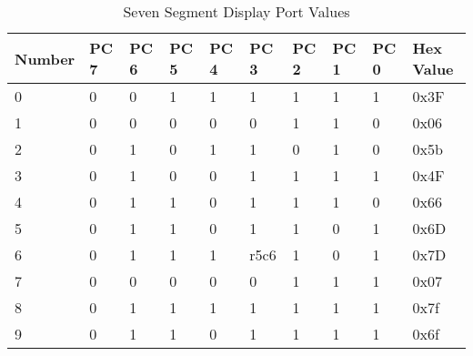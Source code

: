 \documentclass{article}
\begin{document}
\begin{table}[htb!]
	\caption{Seven Segment Display Port Values}
	\label{table:label}
	\centering
	\begin{tabular}{llllllllll}
		\toprule
		\textbf{Number} & \textbf{PC 7} & \textbf{PC 6} & \textbf{PC 5} & \textbf{PC 4} & \textbf{PC 3} & \textbf{PC 2} & \textbf{PC 1} & \textbf{PC 0} & \textbf{Hex Value}\\
		\midrule
		             0 &              0 &              0 &              1 &              1 &              1 &              1 &              1 &              1 &              0x3F\\
		             1 &              0 &              0 &              0 &              0 &              0 &              1 &              1 &              0 &              0x06\\
		             2 &              0 &              1 &              0 &              1 &              1 &              0 &              1 &              0 &              0x5b\\
		             3 &              0 &              1 &              0 &              0 &              1 &              1 &              1 &              1 &              0x4F\\
		             4 &              0 &              1 &              1 &              0 &              1 &              1 &              1 &              0 &              0x66\\
		             5 &              0 &              1 &              1 &              0 &              1 &              1 &              0 &              1 &              0x6D\\
		             6 &              0 &              1 &              1 &              1 &              r5c6 &              1 &              0 &              1 &              0x7D\\
		             7 &              0 &              0 &              0 &              0 &              0 &              1 &              1 &              1 &              0x07\\
		             8 &              0 &              1 &              1 &              1 &              1 &              1 &              1 &              1 &              0x7f\\
		             9 &              0 &              1 &              1 &              0 &              1 &              1 &              1 &              1 &              0x6f\\
		\bottomrule
	\end{tabular}
\end{table}
\end{document}
